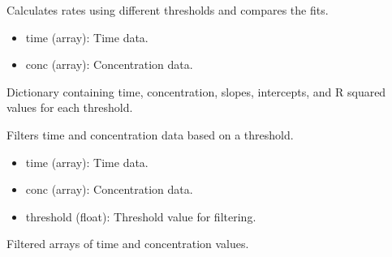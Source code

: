 \documentclass[a4paper,10pt,english]{sphinxmanual}
\begin{document}
\begin{fulllineitems}
\label{\detokenize{utils:src.utils.initial_rate.calculate_rate_compare}}
\pysigstartsignatures
{}
\pysigstopsignatures
\sphinxAtStartPar
Calculates rates using different thresholds and compares the fits.
\begin{description}
\begin{itemize}
\item {} 
\sphinxAtStartPar
time (array): Time data.

\item {} 
\sphinxAtStartPar
conc (array): Concentration data.

\end{itemize}

\sphinxAtStartPar
Dictionary containing time, concentration, slopes, intercepts, and R squared values for each threshold.

\end{description}

\end{fulllineitems}


\begin{fulllineitems}
\label{\detokenize{utils:src.utils.initial_rate.cut_data}}
\pysigstartsignatures
{}
\pysigstopsignatures
\sphinxAtStartPar
Filters time and concentration data based on a threshold.
\begin{description}
\begin{itemize}
\item {} 
\sphinxAtStartPar
time (array): Time data.

\item {} 
\sphinxAtStartPar
conc (array): Concentration data.

\item {} 
\sphinxAtStartPar
threshold (float): Threshold value for filtering.

\end{itemize}

\sphinxAtStartPar
Filtered arrays of time and concentration values.

\end{description}

\end{fulllineitems}
\end{document}
